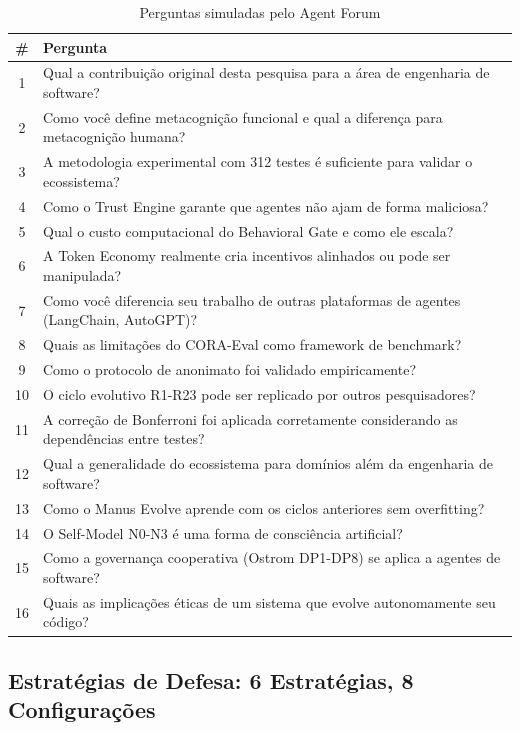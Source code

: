 \begin{table}[htb]
\centering
\caption{Perguntas simuladas pelo Agent Forum}
\label{tab:perguntas-banca}
\begin{tabular}{cp{10cm}}
\toprule
\textbf{\#} & \textbf{Pergunta} \\
\midrule
1 & Qual a contribuição original desta pesquisa para a área de engenharia de software? \\
2 & Como você define metacognição funcional e qual a diferença para metacognição humana? \\
3 & A metodologia experimental com 312 testes é suficiente para validar o ecossistema? \\
4 & Como o Trust Engine garante que agentes não ajam de forma maliciosa? \\
5 & Qual o custo computacional do Behavioral Gate e como ele escala? \\
6 & A Token Economy realmente cria incentivos alinhados ou pode ser manipulada? \\
7 & Como você diferencia seu trabalho de outras plataformas de agentes (LangChain, AutoGPT)? \\
8 & Quais as limitações do CORA-Eval como framework de benchmark? \\
9 & Como o protocolo de anonimato foi validado empiricamente? \\
10 & O ciclo evolutivo R1-R23 pode ser replicado por outros pesquisadores? \\
11 & A correção de Bonferroni foi aplicada corretamente considerando as dependências entre testes? \\
12 & Qual a generalidade do ecossistema para domínios além da engenharia de software? \\
13 & Como o Manus Evolve aprende com os ciclos anteriores sem overfitting? \\
14 & O Self-Model N0-N3 é uma forma de consciência artificial? \\
15 & Como a governança cooperativa (Ostrom DP1-DP8) se aplica a agentes de software? \\
16 & Quais as implicações éticas de um sistema que evolve autonomamente seu código? \\
\bottomrule
\end{tabular}
\end{table}

\subsection{Estratégias de Defesa: 6 Estratégias, 8 Configurações}

